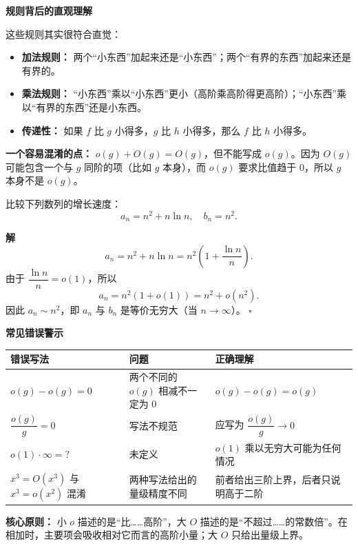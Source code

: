 \documentclass[fontset=fandol]{ctexart}
\newenvironment{custom}[1]{\par\noindent\textbf{#1}\quad}{\par\vspace{0.8em}}
\newenvironment{solution}{\par\noindent\textbf{解}\quad}{\hfill$\square$\par\vspace{0.8em}}
\begin{document}
\begin{custom}{规则背后的直观理解}

这些规则其实很符合直觉：

\begin{itemize}
\item \textbf{加法规则：} 两个“小东西”加起来还是“小东西”；两个“有界的东西”加起来还是有界的。
\item \textbf{乘法规则：} “小东西”乘以“小东西”更小（高阶乘高阶得更高阶）；“小东西”乘以“有界的东西”还是小东西。
\item \textbf{传递性：} 如果 \(f\) 比 \(g\) 小得多，\(g\) 比 \(h\) 小得多，那么 \(f\) 比 \(h\) 小得多。
\end{itemize}

\textbf{一个容易混淆的点：} \(o(g) + O(g) = O(g)\)，但不能写成 \(o(g)\)。因为 \(O(g)\) 可能包含一个与 \(g\) 同阶的项（比如 \(g\) 本身），而 \(o(g)\) 要求比值趋于 0，所以 \(g\) 本身不是 \(o(g)\)。
\end{custom}


\begin{example}[利用 o 和 O 比较数列增长]
比较下列数列的增长速度：
\[
a_n = n^2 + n \ln n,\quad b_n = n^2.
\]

\begin{solution}
\[
a_n = n^2 + n \ln n = n^2 \left(1 + \dfrac{\ln n}{n}\right).
\]
由于 \(\dfrac{\ln n}{n} = o(1)\)，所以
\[
a_n = n^2 (1 + o(1)) = n^2 + o(n^2).
\]
因此 \(a_n \sim n^2\)，即 \(a_n\) 与 \(b_n\) 是等价无穷大（当 \(n \to \infty\)）。
\end{solution}
\end{example}

\begin{custom}{常见错误警示}

\begin{center}
\small
\begin{tabularx}{\textwidth}{|>{\raggedright\arraybackslash}X|>{\raggedright\arraybackslash}X|>{\raggedright\arraybackslash}X|}
\hline
\textbf{错误写法} & \textbf{问题} & \textbf{正确理解} \\
\hline
\(o(g) - o(g) = 0\) & 两个不同的 \(o(g)\) 相减不一定为 0 & \(o(g) - o(g) = o(g)\) \\
\hline
\(\dfrac{o(g)}{g} = 0\) & 写法不规范 & 应写为 \(\dfrac{o(g)}{g} \to 0\) \\
\hline
\(o(1) \cdot \infty = ?\) & 未定义 & \(o(1)\) 乘以无穷大可能为任何情况 \\
\hline
\(x^3=O(x^3)\) 与 \(x^3=o(x^2)\) 混淆 & 两种写法给出的量级精度不同 & 前者给出三阶上界，后者只说明高于二阶 \\
\hline
\end{tabularx}
\end{center}

\textbf{核心原则：} 小 \(o\) 描述的是“比……高阶”，大 \(O\) 描述的是“不超过……的常数倍”。在相加时，主要项会吸收相对它而言的高阶小量；大 \(O\) 只给出量级上界。
\end{custom}
\end{document}
